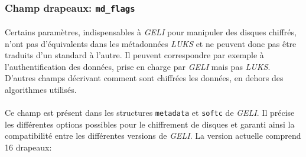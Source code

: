 \subsubsection{Champ drapeaux: \texttt{md\_flags}}
\paragraph{}
Certains paramètres, indispensables à \textit{GELI} pour manipuler des disques
chiffrés, n'ont pas d'équivalents dans les métadonnées \textit{LUKS} et ne
peuvent donc pas être traduits d'un standard à l'autre. Il peuvent correspondre
par exemple à l'authentification des données, prise en charge par \textit{GELI}
mais pas \textit{LUKS}. D'autres champs décrivant comment sont chiffrées les
données, en dehors des algorithmes utilisés.
\paragraph{}
Ce champ est présent dans les structures \texttt{metadata} et \texttt{softc} de
\textit{GELI}. Il précise les différentes options possibles pour le chiffrement
de disques et garanti ainsi la compatibilité entre les différentes versions de
\textit{GELI}. La version actuelle comprend 16 drapeaux: \\
\\
